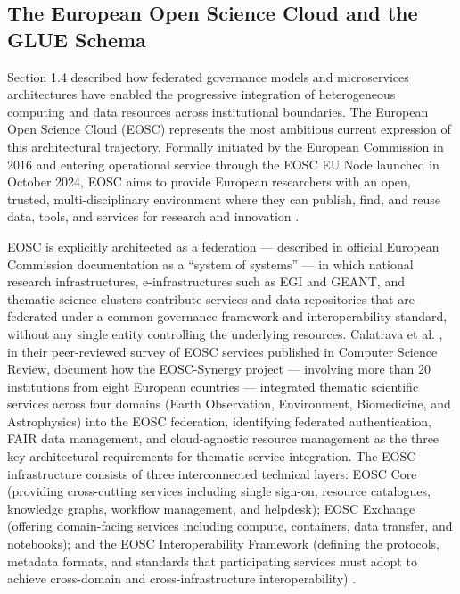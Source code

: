 \documentclass[12pt,a4paper]{report}
\begin{document}
      \subsection*{The European Open Science Cloud and the GLUE Schema}
      Section 1.4 described how federated governance models and microservices architectures have enabled the progressive integration 
      of heterogeneous computing and data resources across institutional boundaries. The European Open Science Cloud (EOSC) represents 
      the most ambitious current expression of this architectural trajectory. Formally initiated by the European Commission in 2016 and 
      entering operational service through the EOSC EU Node launched in October 2024, EOSC aims to provide European researchers with an 
      open, trusted, multi-disciplinary environment where they can publish, find, and reuse data, tools, and services for research and 
      innovation \parencite{eosc2022}. 

      EOSC is explicitly architected as a federation — described in official European Commission documentation as a “system of systems” — in which national research 
      infrastructures, e-infrastructures such as EGI and GEANT, and thematic science clusters contribute services and data repositories
       that are federated under a common governance framework and interoperability standard, without any single entity controlling the 
       underlying resources. Calatrava et al. \parencite{calatrava2023}, in their peer-reviewed survey of EOSC services published in Computer Science Review,
        document how the EOSC-Synergy project — involving more than 20 institutions from eight European countries — integrated thematic
         scientific services across four domains (Earth Observation, Environment, Biomedicine, and Astrophysics) into the EOSC federation,
          identifying federated authentication, FAIR data management, and cloud-agnostic resource management as the three key architectural
           requirements for thematic service integration. The EOSC infrastructure consists of three interconnected technical layers: EOSC Core 
           (providing cross-cutting services including single sign-on, resource catalogues, knowledge graphs, workflow management, and helpdesk);
            EOSC Exchange (offering domain-facing services including compute, containers, data transfer, and notebooks); and the EOSC 
            Interoperability Framework (defining the protocols, metadata formats, and standards that participating services must adopt 
            to achieve cross-domain and cross-infrastructure interoperability) \parencite{eosc2022}.
\end{document}
